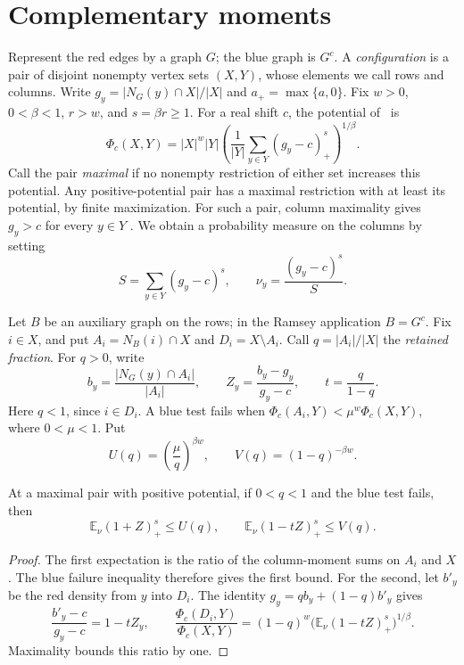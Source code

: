 \section{Complementary moments}
\label{sec:complementary-moments}

Represent the red edges by a graph $G$; the blue graph is $G^c$.
A \emph{configuration} is a pair of disjoint nonempty vertex sets
$(X,Y)$, whose elements we call rows and columns. Write
$g_y=|N_G(y)\cap X|/|X|$ and $a_+=\max\{a,0\}$.
Fix $w>0$, $0<\beta<1$, $r>w$, and $s=\beta r\ge1$.
For a real shift $c$, the potential of~\cite[Section~3.1]{ZBS} is
\begin{equation}\label{eq:potential}
 \Phi_c(X,Y)=|X|^w|Y|
 \left(\frac1{|Y|}\sum_{y\in Y}(g_y-c)_+^s\right)^{1/\beta}.
\end{equation}
Call the pair \emph{maximal} if no nonempty restriction of either set
increases this potential. Any positive-potential pair has a maximal restriction
with at least its potential, by finite maximization. For such a pair,
column maximality gives $g_y>c$ for every $y\in Y$
\cite[Lemma~3.1]{ZBS}. We obtain a probability measure on the columns by setting
\[
 S=\sum_{y\in Y}(g_y-c)^s,\qquad
 \nu_y=\frac{(g_y-c)^s}{S}.
\]

Let $B$ be an auxiliary graph on the rows; in the Ramsey application
$B=G^c$. Fix $i\in X$, and put
$A_i=N_B(i)\cap X$ and $D_i=X\setminus A_i$.
Call $q=|A_i|/|X|$ the \emph{retained fraction}.
For $q>0$, write
\[
 b_y=\frac{|N_G(y)\cap A_i|}{|A_i|},\qquad
 Z_y=\frac{b_y-g_y}{g_y-c},\qquad t=\frac q{1-q}.
\]
Here $q<1$, since $i\in D_i$. A blue test fails when
$\Phi_c(A_i,Y)<\mu^w\Phi_c(X,Y)$, where $0<\mu<1$. Put
\[
 U(q)=\left(\frac\mu q\right)^{\beta w},\qquad
 V(q)=(1-q)^{-\beta w}.
\]

\begin{lemma}\label{lem:two-moments}
At a maximal pair with positive potential, if $0<q<1$ and the blue
test fails, then
\begin{equation}\label{eq:two-moments}
 \mathbb E_\nu(1+Z)_+^s\le U(q),\qquad
 \mathbb E_\nu(1-tZ)_+^s\le V(q).
\end{equation}
\end{lemma}
\begin{proof}
The first expectation is the ratio of the column-moment sums on $A_i$
and $X$. The blue failure inequality therefore gives the first bound.
For the second, let $b'_y$ be the red density from $y$ into $D_i$.
The identity $g_y=qb_y+(1-q)b'_y$ gives
\[
 \frac{b'_y-c}{g_y-c}=1-tZ_y,\qquad
 \frac{\Phi_c(D_i,Y)}{\Phi_c(X,Y)}
   =(1-q)^w\bigl(\mathbb E_\nu(1-tZ)_+^s\bigr)^{1/\beta}.
\]
Maximality bounds this ratio by one.
\end{proof}

